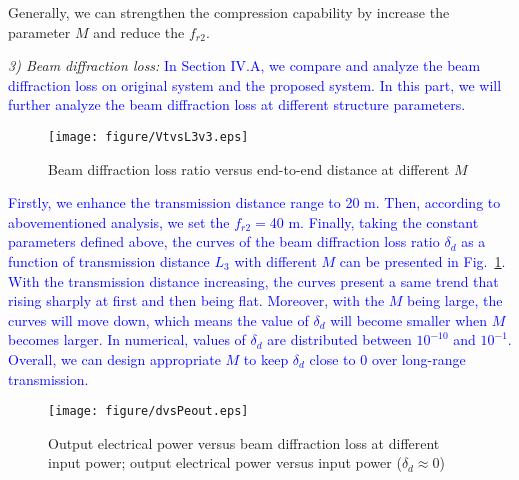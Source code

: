 \documentclass{IEEEtran}
\begin{document}
Generally, we can strengthen the compression capability by increase the parameter $M$ and reduce the $f_{r2}$.  

\emph{3) Beam diffraction loss:}
\textcolor{blue}{In Section IV.A, we compare and analyze the beam diffraction loss on original system and the proposed system. 
In this part, we will further analyze the beam diffraction loss at different structure parameters. }
\begin{figure}
    \centering
    \texttt{[image: figure/VtvsL3v3.eps]}
    \caption{Beam diffraction loss ratio versus end-to-end distance at different $M$}
    \label{vt}
\end{figure}
\textcolor{blue}{Firstly, we enhance the transmission distance range to 20 m. Then, according to abovementioned analysis, we set the $f_{r2}=$40 m. Finally, taking the constant parameters defined above, the curves of the beam diffraction loss ratio $\delta_d$ as a function of transmission distance $L_3$ with different $M$ can be presented in Fig.~\ref{vt}. With the transmission distance increasing, the curves present a same trend that rising sharply at first and then being flat. Moreover, with the $M$ being large, the curves will move down, which means the value of $\delta_d$ will become smaller when $M$ becomes larger. In numerical, values of $\delta_d$ are distributed between $10^{-10}$ and $10^{-1}$. Overall, we can design appropriate $M$ to keep $\delta_d$ close to 0 over long-range transmission.
}
\begin{figure}[t]
	\centering
	\texttt{[image: figure/dvsPeout.eps]}
	\caption{Output electrical power versus beam diffraction loss at different input power; output electrical power versus input power ($\delta_d\approx0$)}
	\label{output1}
\end{figure}
\end{document}

